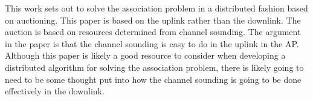 This work sets out to solve the association problem in a distributed fashion based on auctioning. This paper is based on the uplink rather than the downlink. The auction is based on resources determined from channel sounding. The argument in the paper is that the channel sounding is easy to do in the uplink in the AP. Although this paper is likely a good resource to consider when developing a distributed algorithm for solving the association problem, there is likely going to need to be some thought put into how the channel sounding is going to be done effectively in the downlink.